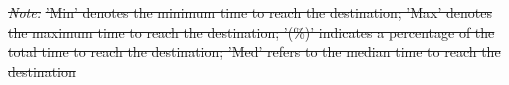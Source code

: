 \documentclass[Royal,times,sageh]{sagej}
\providecommand{\DIFdeltex}[1]{{\protect\color{red}\sout{#1}}} %
\providecommand{\DIFdel}[1]{\texorpdfstring{\DIFdeltex{#1}}{}} %
\begin{document}
\textit{\DIFdel{Note: }} 
\DIFdel{'Min' denotes the minimum time to reach the destination; 'Max' denotes the maximum time to reach the destination; '(\%)' indicates a percentage of the total time to reach the destination; 'Med' refers to the median time to reach the destination
}%
\end{document}
